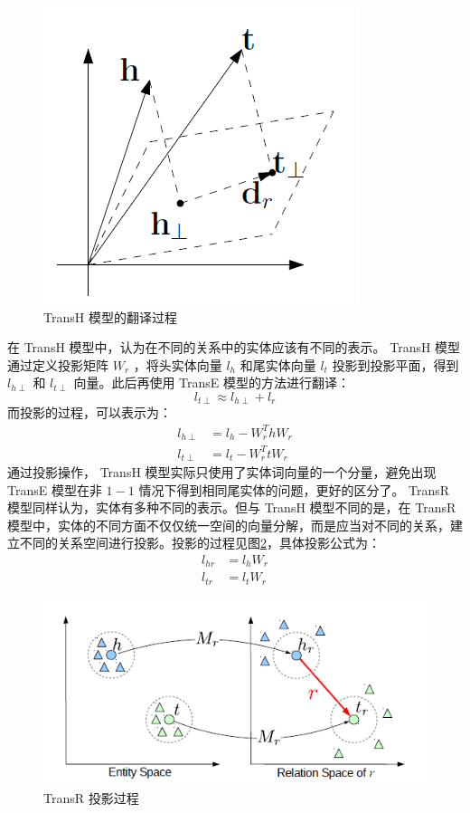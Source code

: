 \documentclass{llncs}
\begin{document}
\begin{figure}
	\centering
	\includegraphics[width=0.5\columnwidth]{figures/TransH.png}
	\caption{ TransH 模型的翻译过程}
	\label{fg:TransH}
\end{figure}

在 TransH 模型中，认为在不同的关系中的实体应该有不同的表示。 TransH 模型通过定义投影矩阵 $W_r$ ，将头实体向量 $l_h$ 和尾实体向量 $l_t$ 投影到投影平面，得到 $l_{h\perp}$ 和 $l_{t\perp}$ 向量。此后再使用 TransE 模型的方法进行翻译：
\begin{displaymath}
l_{t\perp}\approx l_{h\perp}+l_r
\end{displaymath}
而投影的过程，可以表示为：
\begin{displaymath}
	\begin{split}{}
	l_{h\perp}&=l_h-W_r^ThW_r \\
	l_{t\perp}&=l_t-W_r^TtW_r
	\end{split}
\end{displaymath}
通过投影操作， TransH 模型实际只使用了实体词向量的一个分量，避免出现 TransE 模型在非 $1-1$ 情况下得到相同尾实体的问题，更好的区分了。 TransR 模型\cite{DBLP:conf/aaai/LinLSLZ15}同样认为，实体有多种不同的表示。但与 TransH 模型不同的是，在 TransR 模型中，实体的不同方面不仅仅统一空间的向量分解，而是应当对不同的关系，建立不同的关系空间进行投影。投影的过程见图\ref{fg:TransR}，具体投影公式为：
\begin{displaymath}
	\begin{split}
	l_{hr}&=l_hW_r \\
	l_{tr}&=l_tW_r
	\end{split}
\end{displaymath}

\begin{figure}
	\centering
	\includegraphics[width=0.5\columnwidth]{figures/TransR.png}
	\caption{ TransR 投影过程}
	\label{fg:TransR}
\end{figure}
\end{document}
